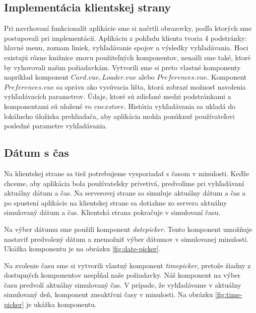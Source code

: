 \subsection{Implementácia klientskej strany} 
Pri navrhovaní funkcionalít aplikácie sme si načrtli obrazovky, podľa ktorých sme postupovali pri implementácii. 
Aplikáciu z pohľadu klienta tvoria 4 podstránky: hlavné menu, zoznam liniek, vyhľadávanie spojov a výsledky vyhľadávania. Hoci existujú rôzne knižnice znovu použiteľných komponentov, nenašli sme také, ktoré by vyhovovali našim požiadavkám. Vytvorili sme si preto vlastné komponenty napríklad komponent $Card.vue, Loader.vue$ alebo $Preferences.vue$. Komponent $Preferences.vue$ sa správa ako vysúvacia lišta, ktorá zobrazí možnosť navolenia vyhľadávacích parametrov. Údaje, ktoré sú zdieľané medzi podstránkami a komponentami sú uložené vo $vuex store$. História vyhľadávania sa ukladá do lokálneho úložiska prehliadača, aby aplikácia mohla ponúknuť používateľovi posledné parametre vyhľadávania.


\subsection{Dátum s čas}
Na klientskej strane sa tiež potrebujeme vysporiadať s časom v minulosti. Keďže chceme, aby aplikácia bola používateľsky prívetivá, predvolíme pri vyhľadávaní aktuálny dátum a čas. Na serverovej strane sa simuluje aktuálny dátum a čas a po spustení aplikácie na klientskej strane sa dotiahne zo servera aktuálny simulovaný dátum a čas. Klientská strana pokračuje v simulovaní času. 

Na výber dátumu sme použili komponent \textit{datepicker}. Tento komponent umožňuje nastaviť predvolený dátum a znemožniť výber dátumov v simulovanej minulosti. Ukážka komponentu je na obrázku \ref{fig:date-picker}.

Na zvolenie času sme si vytvorili vlastný komponent \textit{timepicker}, pretože žiadny z dostupných komponentov nespĺňal naše požiadavky. Náš komponent na výber času predvolí aktuálny simulovaný čas. V prípade, že vyhľadávame v aktuálny simulovaný deň, komponent zneaktívni časy v minulosti. Na obrázku \ref{fig:time-picker} je ukážka komponentu.

